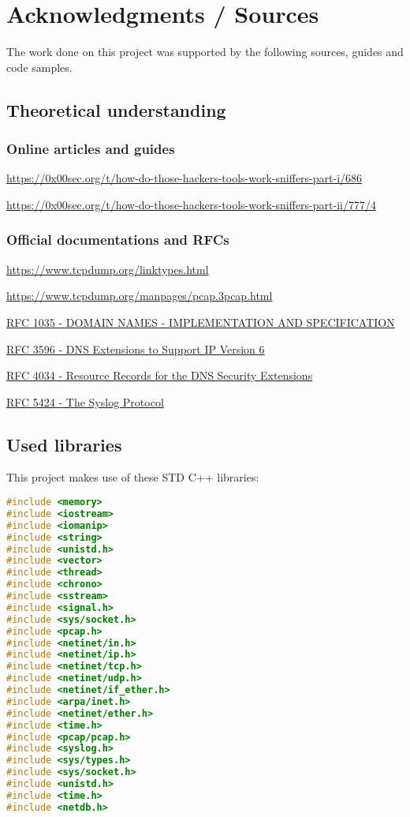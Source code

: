 
\section{Acknowledgments / Sources}

The work done on this project was supported by the following sources, guides and code samples.

\subsection{Theoretical understanding}


\subsubsection{Online articles and guides}

\url{https://0x00sec.org/t/how-do-those-hackers-tools-work-sniffers-part-i/686}

\url{https://0x00sec.org/t/how-do-those-hackers-tools-work-sniffers-part-ii/777/4}

\subsubsection{Official documentations and RFCs}

\url{https://www.tcpdump.org/linktypes.html}

\url{https://www.tcpdump.org/manpages/pcap.3pcap.html}

\href{https://www.ietf.org/rfc/rfc1035.txt}{RFC 1035 - DOMAIN NAMES - IMPLEMENTATION AND SPECIFICATION}

\href{https://tools.ietf.org/html/rfc3596}{RFC 3596 - DNS Extensions to Support IP Version 6}

\href{https://www.ietf.org/rfc/rfc4034.txt}{RFC 4034 - Resource Records for the DNS Security Extensions}

\href{https://tools.ietf.org/html/rfc5424}{RFC 5424 - The Syslog Protocol}

\subsection{Used libraries}

This project makes use of these STD C++ libraries:

\begin{lstlisting}[language=C++] 
#include <memory>
#include <iostream>
#include <iomanip>
#include <string>
#include <unistd.h>
#include <vector>
#include <thread>
#include <chrono>
#include <sstream>
#include <signal.h>
#include <sys/socket.h>
#include <pcap.h>
#include <netinet/in.h>
#include <netinet/ip.h>
#include <netinet/tcp.h>
#include <netinet/udp.h>
#include <netinet/if_ether.h>
#include <arpa/inet.h>
#include <netinet/ether.h> 
#include <time.h>
#include <pcap/pcap.h>
#include <syslog.h>
#include <sys/types.h>
#include <sys/socket.h>
#include <unistd.h>
#include <time.h>
#include <netdb.h>
\end{lstlisting}


